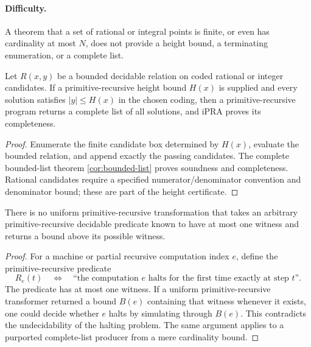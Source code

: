 \paragraph{Difficulty.}
A theorem that a set of rational or integral points is finite, or even has cardinality at most $N$, does not provide a height bound, a terminating enumeration, or a complete list.

\begin{theorem}\label{thm:height-list}
Let $R(x,y)$ be a bounded decidable relation on coded rational or integer candidates.  If a primitive-recursive height bound $H(x)$ is supplied and every solution satisfies $|y|\leq H(x)$ in the chosen coding, then a primitive-recursive program returns a complete list of all solutions, and iPRA proves its completeness.
\end{theorem}

\begin{proof}
Enumerate the finite candidate box determined by $H(x)$, evaluate the bounded relation, and append exactly the passing candidates.  The complete bounded-list theorem \cref{cor:bounded-list} proves soundness and completeness.  Rational candidates require a specified numerator/denominator convention and denominator bound; these are part of the height certificate.
\end{proof}

\begin{proposition}\label{prop:cardinality-cutoff}
There is no uniform primitive-recursive transformation that takes an arbitrary primitive-recursive decidable predicate known to have at most one witness and returns a bound above its possible witness.
\end{proposition}

\begin{proof}
For a machine or partial recursive computation index $e$, define the primitive-recursive predicate
\[
 R_e(t)\quad\Longleftrightarrow\quad
 \text{``the computation $e$ halts for the first time exactly at step $t$''}.
\]
The predicate has at most one witness.  If a uniform primitive-recursive transformer returned a bound $B(e)$ containing that witness whenever it exists, one could decide whether $e$ halts by simulating through $B(e)$.  This contradicts the undecidability of the halting problem.  The same argument applies to a purported complete-list producer from a mere cardinality bound.
\end{proof}

